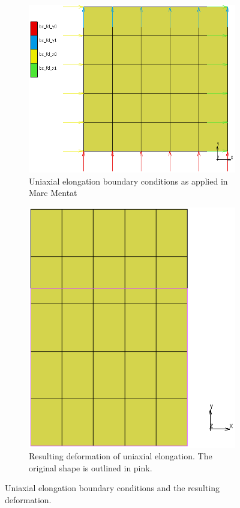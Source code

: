 \begin{figure}[H]
	\centering
	\begin{subfigure}[b]{0.45\textwidth}
		\centering
		\includegraphics[width=\textwidth]{C1BC.png}
		\caption{Uniaxial elongation boundary conditions as applied in Marc Mentat}
		\label{fig:c1bc}
	\end{subfigure}
	\hfill
	\begin{subfigure}[b]{0.4\textwidth}
		\centering
		\includegraphics[width=\textwidth]{C1Def.png}
		\caption{Resulting deformation of uniaxial elongation. The original shape is outlined in pink.}
		\label{fig:c1def}
	\end{subfigure}
	\caption[Uniaxial elongation boundary conditions and deformation]{Uniaxial elongation boundary conditions and the resulting deformation.}
	\label{fig:c1}
\end{figure}

